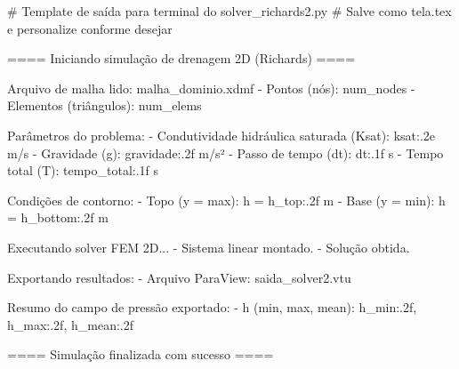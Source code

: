 # Template de saída para terminal do solver_richards2.py
# Salve como tela.tex e personalize conforme desejar

====  Iniciando simulação de drenagem 2D (Richards)  ====

Arquivo de malha lido: malha_dominio.xdmf
     - Pontos (nós): {num_nodes}
     - Elementos (triângulos): {num_elems}

Parâmetros do problema:
     - Condutividade hidráulica saturada (Ksat): {ksat:.2e} m/s
     - Gravidade (g): {gravidade:.2f} m/s²
     - Passo de tempo (dt): {dt:.1f} s
     - Tempo total (T): {tempo_total:.1f} s

Condições de contorno:
     - Topo (y = max): h = {h_top:.2f} m
     - Base (y = min): h = {h_bottom:.2f} m

Executando solver FEM 2D...
     - Sistema linear montado.
     - Solução obtida.

Exportando resultados:
     - Arquivo ParaView: saida_solver2.vtu

Resumo do campo de pressão exportado:
     - h (min, max, mean): {h_min:.2f}, {h_max:.2f}, {h_mean:.2f}

====  Simulação finalizada com sucesso  ====
